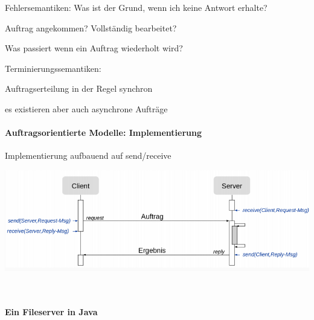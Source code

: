 \documentclass[10pt]{article}
\begin{document}
  \begin{itemize*}
    \item Fehlersemantiken: Was ist der Grund, wenn ich keine Antwort erhalte?
    \begin{itemize*}
      \item Auftrag angekommen? Vollständig bearbeitet?
      \item Was passiert wenn ein Auftrag wiederholt wird?
    \end{itemize*}
    \item Terminierungssemantiken:
    \begin{itemize*}
      \item Auftragserteilung in der Regel synchron
      \item es existieren aber auch asynchrone Aufträge
    \end{itemize*}
  \end{itemize*}
  
  \paragraph{Auftragsorientierte Modelle: Implementierung}
  
  \begin{itemize*}
    \item Implementierung aufbauend auf send/receive
  \end{itemize*}
  \begin{center}
    \includegraphics[width=0.4\linewidth]{Assets/Programmierparadigmen-kommunikation}
  \end{center} \ \linebreak
  
  \paragraph{Ein Fileserver in Java}
  
\end{document}
